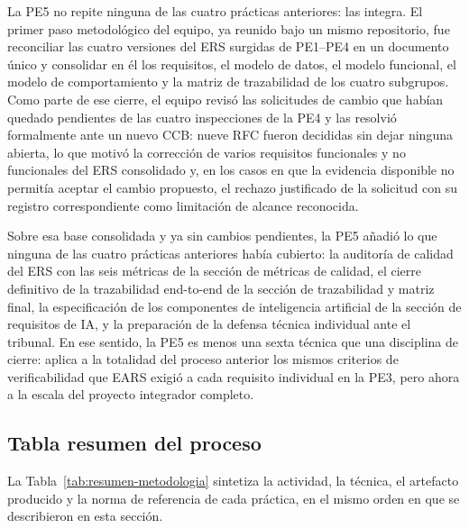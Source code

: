 \documentclass[journal,onecolumn]{IEEEtran}
\begin{document}
	La PE5 no repite ninguna de las cuatro prácticas anteriores: las integra. El primer paso
	metodológico del equipo, ya reunido bajo un mismo repositorio, fue reconciliar las cuatro
	versiones del ERS surgidas de PE1--PE4 en un documento único y consolidar en él los
	requisitos, el modelo de datos, el modelo funcional, el modelo de comportamiento y la
	matriz de trazabilidad de los cuatro subgrupos. Como parte de ese cierre, el equipo revisó
	las solicitudes de cambio que habían quedado pendientes de las cuatro inspecciones de la
	PE4 y las resolvió formalmente ante un nuevo CCB: nueve RFC fueron decididas sin dejar
	ninguna abierta, lo que motivó la corrección de varios requisitos funcionales y no
	funcionales del ERS consolidado y, en los casos en que la evidencia disponible no permitía
	aceptar el cambio propuesto, el rechazo justificado de la solicitud con su registro
	correspondiente como limitación de alcance reconocida. 
	
	Sobre esa base consolidada y ya sin
	cambios pendientes, la PE5 añadió lo que ninguna de las cuatro prácticas anteriores había
	cubierto: la auditoría de calidad del ERS con las seis métricas de
	la sección de métricas de calidad, el cierre definitivo de la trazabilidad end-to-end de la
	sección de trazabilidad y matriz final, la especificación de los componentes de
	inteligencia artificial de la sección de requisitos de IA, y la preparación de la defensa técnica individual
	ante el tribunal. En ese sentido, la PE5 es menos una sexta técnica que una disciplina de
	cierre: aplica a la totalidad del proceso anterior los mismos criterios de verificabilidad
	que EARS exigió a cada requisito individual en la PE3, pero ahora a la escala del proyecto
	integrador completo.
	
	\newpage
	
	\subsection{Tabla resumen del proceso}
	
	La Tabla~\ref{tab:resumen-metodologia} sintetiza la actividad, la técnica, el artefacto
	producido y la norma de referencia de cada práctica, en el mismo orden en que se
	describieron en esta sección.
	
\end{document}
